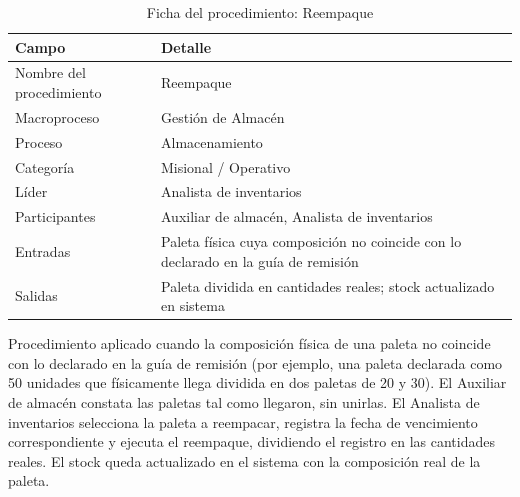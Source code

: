 \documentclass[11pt, a4paper, oneside]{report}
\begin{document}
\begin{table}[H]
\centering\small
\renewcommand{\arraystretch}{1.25}
\setlength{\tabcolsep}{6pt}
\begin{tabularx}{\textwidth}{|>{\raggedright\arraybackslash}p{}|>{\raggedright\arraybackslash}X|}
\hline
\rowcolor{upeu_mid}
\color{white}\bfseries Campo & \color{white}\bfseries Detalle \\ \hline
\rowcolor{gray!10}
Nombre del procedimiento & Reempaque \\ \hline
Macroproceso & Gestión de Almacén \\ \hline
\rowcolor{gray!10}
Proceso & Almacenamiento \\ \hline
Categoría & Misional / Operativo \\ \hline
\rowcolor{gray!10}
Líder & Analista de inventarios \\ \hline
Participantes & Auxiliar de almacén, Analista de inventarios \\ \hline
Entradas & Paleta física cuya composición no coincide con lo declarado en la guía de remisión \\ \hline
\rowcolor{gray!10}
Salidas & Paleta dividida en cantidades reales; stock actualizado en sistema \\ \hline
\end{tabularx}
\caption{Ficha del procedimiento: Reempaque}
\end{table}

Procedimiento aplicado cuando la composición física de una paleta no coincide con lo declarado en la guía de remisión (por ejemplo, una paleta declarada como 50 unidades que físicamente llega dividida en dos paletas de 20 y 30). El Auxiliar de almacén constata las paletas tal como llegaron, sin unirlas. El Analista de inventarios selecciona la paleta a reempacar, registra la fecha de vencimiento correspondiente y ejecuta el reempaque, dividiendo el registro en las cantidades reales. El stock queda actualizado en el sistema con la composición real de la paleta.
\end{document}
